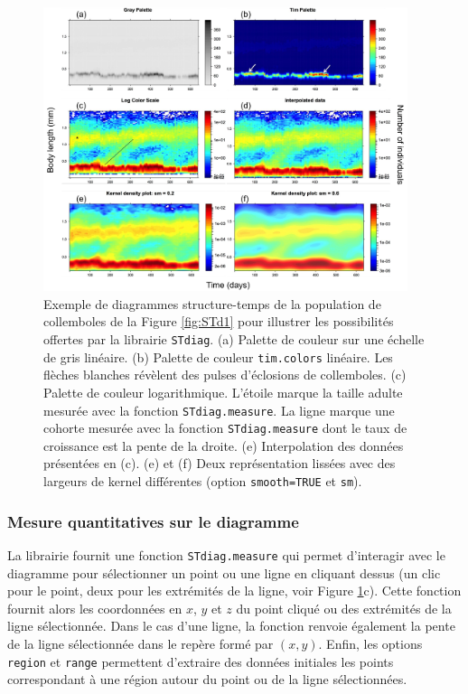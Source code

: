 \begin{figure}[!ht]
\begin{center}
\includegraphics[width=0.95\textwidth]{1_CorpsDeThese/Methodo/STdiag2}
\caption[ Diagrammes
structure-temps pour une population exemple]{Exemple de diagrammes
structure-temps de la population de collemboles de la Figure \ref{fig:STd1} pour
illustrer les possibilités offertes par la librairie \texttt{STdiag}. (a)
Palette de couleur sur une échelle de gris linéaire. (b) Palette de couleur
\texttt{tim.colors} linéaire. Les flèches blanches révèlent des pulses
d'éclosions de collemboles. (c) Palette de couleur logarithmique. L'étoile marque la taille adulte mesurée avec la fonction \texttt{STdiag.measure}. La ligne marque une cohorte mesurée avec la
fonction \texttt{STdiag.measure} dont le taux de croissance est la pente de la
droite. (e) Interpolation des données présentées en (c). (e) et (f) Deux
représentation lissées avec des largeurs de kernel différentes (option
\texttt{smooth=TRUE} et \texttt{sm}). }
\label{fig:STd2}
\end{center}
\end{figure}

\subsubsection{Mesure quantitatives sur le diagramme}

La librairie fournit une fonction \texttt{STdiag.measure} qui permet d'interagir
avec le diagramme pour sélectionner un point ou une ligne en cliquant dessus (un
clic pour le point, deux pour les extrémités de la ligne, voir Figure \ref{fig:STd2}c). Cette fonction fournit alors les coordonnées en $x$,
$y$ et $z$ du point cliqué ou des extrémités de la ligne sélectionnée. Dans le cas d'une ligne, la fonction
renvoie également la pente de la ligne sélectionnée dans le repère formé par
$(x,y)$. Enfin, les options \texttt{region} et \texttt{range} permettent
d'extraire des données initiales les points correspondant à une région autour du
point ou de la ligne sélectionnées.

